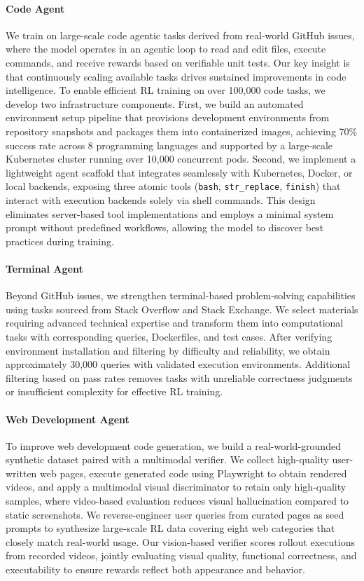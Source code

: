 \paragraph{Code Agent} We train on large-scale code agentic tasks derived from real-world GitHub issues, where the model operates in an agentic loop to read and edit files, execute commands, and receive rewards based on verifiable unit tests. Our key insight is that continuously scaling available tasks drives sustained improvements in code intelligence. To enable efficient RL training on over 100,000 code tasks, we develop two infrastructure components. First, we build an automated environment setup pipeline that provisions development environments from repository snapshots and packages them into containerized images, achieving 70\% success rate across 8 programming languages and supported by a large-scale Kubernetes cluster running over 10,000 concurrent pods. Second, we implement a lightweight agent scaffold that integrates seamlessly with Kubernetes, Docker, or local backends, exposing three atomic tools (\texttt{bash}, \texttt{str\_replace}, \texttt{finish}) that interact with execution backends solely via shell commands. This design eliminates server-based tool implementations and employs a minimal system prompt without predefined workflows, allowing the model to discover best practices during training.

\paragraph{Terminal Agent} Beyond GitHub issues, we strengthen terminal-based problem-solving capabilities using tasks sourced from Stack Overflow and Stack Exchange. We select materials requiring advanced technical expertise and transform them into computational tasks with corresponding queries, Dockerfiles, and test cases. After verifying environment installation and filtering by difficulty and reliability, we obtain approximately 30,000 queries with validated execution environments. Additional filtering based on pass rates removes tasks with unreliable correctness judgments or insufficient complexity for effective RL training.

\paragraph{Web Development Agent} To improve web development code generation, we build a real-world-grounded synthetic dataset paired with a multimodal verifier. We collect high-quality user-written web pages, execute generated code using Playwright to obtain rendered videos, and apply a multimodal visual discriminator to retain only high-quality samples, where video-based evaluation reduces visual hallucination compared to static screenshots. We reverse-engineer user queries from curated pages as seed prompts to synthesize large-scale RL data covering eight web categories that closely match real-world usage. Our vision-based verifier scores rollout executions from recorded videos, jointly evaluating visual quality, functional correctness, and executability to ensure rewards reflect both appearance and behavior.

